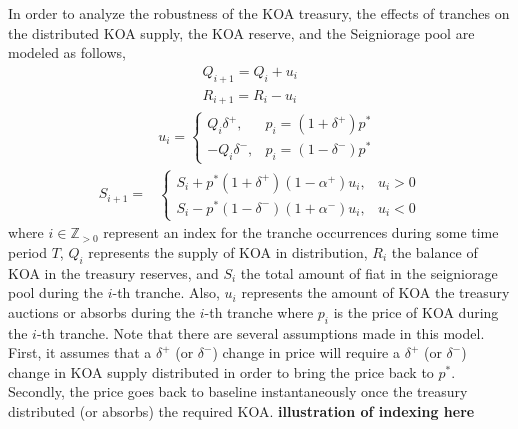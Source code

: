 In order to analyze the robustness of the KOA treasury, the effects of tranches on the distributed KOA supply, the KOA reserve, and the Seigniorage pool are modeled as follows,
%
\begin{align*}
& \qquad \quad \, Q_{i+1} = Q_i + u_i \\
& \qquad \quad \, R_{i+1} = R_i - u_i \\
& u_i =
\begin{cases}
      Q_i \delta^+,  & p_i = (1+\delta^+)p^* \\
      -Q_i \delta^-,  & p_i = (1-\delta^-)p^*
\end{cases}  \\
S_{i+1} = & \begin{cases}
      S_i + p^*(1+\delta^+)(1-\alpha^+)u_i, & u_i > 0 \\
      S_i - p^*(1 - \delta^-)(1+\alpha^-)u_i, & u_i < 0
\end{cases} 
\end{align*}
%
where $i \in \mathbb{Z}_{>0}$ represent an index for the tranche occurrences during some time period $T$, $Q_i$ represents the supply of KOA in distribution, $R_i$ the balance of KOA in the treasury reserves, and $S_i$ the total amount of fiat in the seigniorage pool during the $i$-th tranche. Also, $u_i$ represents the amount of KOA the treasury auctions or absorbs during the $i$-th tranche where $p_i$ is the price of KOA during the $i$-th tranche. Note that there are several assumptions made in this model. First, it assumes that a $\delta^+$ (or $\delta^-$) change in price will require a $\delta^+$ (or $\delta^-$) change in KOA supply distributed in order to bring the price back to $p^*$. Secondly, the price goes back to baseline instantaneously once the treasury distributed (or absorbs) the required KOA. \textbf{illustration of indexing here}

